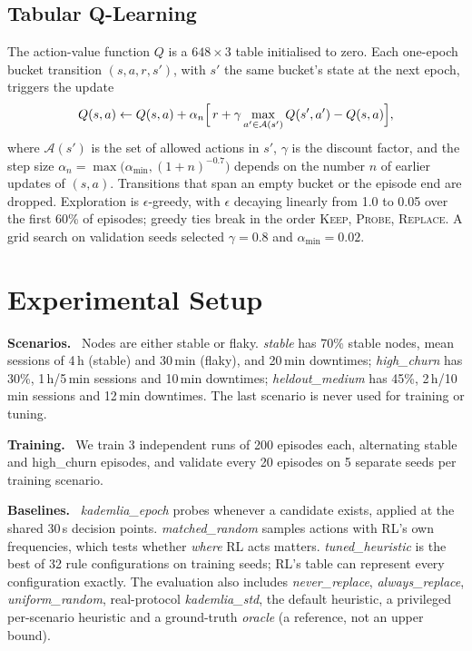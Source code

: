 \documentclass[9pt,twocolumn]{extarticle}
\newcommand{\inl}[1]{\mbox{\textbf{#1.}}\ }
\newcommand{\act}[1]{\textsc{#1}}
\newcommand{\pol}[1]{\textit{#1}}
\begin{document}
\subsection{Tabular Q-Learning}
The action-value function $Q$ is a $648\times3$ table initialised to zero. Each one-epoch bucket transition $(s,a,r,s')$, with $s'$ the same bucket's state at the next epoch, triggers the update
\begin{equation}
Q(s,a) \leftarrow Q(s,a) + \alpha_n \Bigl[\, r + \gamma \max_{a'\in\mathcal{A}(s')} Q(s',a') - Q(s,a) \Bigr],
\label{eq:qupdate}
\end{equation}
where $\mathcal{A}(s')$ is the set of allowed actions in $s'$, $\gamma$ is the discount factor, and the step size $\alpha_n=\max\bigl(\alpha_{\min},(1+n)^{-0.7}\bigr)$ depends on the number $n$ of earlier updates of $(s,a)$. Transitions that span an empty bucket or the episode end are dropped. Exploration is $\epsilon$-greedy, with $\epsilon$ decaying linearly from 1.0 to 0.05 over the first 60\% of episodes; greedy ties break in the order \act{Keep}, \act{Probe}, \act{Replace}. A grid search on validation seeds selected $\gamma=0.8$ and $\alpha_{\min}=0.02$.

\section{Experimental Setup}
\inl{Scenarios} Nodes are either stable or flaky. \pol{stable} has 70\% stable nodes, mean sessions of 4\,h (stable) and 30\,min (flaky), and 20\,min downtimes; \pol{high\_churn} has 30\%, 1\,h/5\,min sessions and 10\,min downtimes; \pol{heldout\_medium} has 45\%, 2\,h/10\,min sessions and 12\,min downtimes. The last scenario is never used for training or tuning.

\inl{Training} We train 3 independent runs of 200 episodes each, alternating stable and high\_churn episodes, and validate every 20 episodes on 5 separate seeds per training scenario.

\inl{Baselines} \pol{kademlia\_epoch} probes whenever a candidate exists, applied at the shared 30\,s decision points. \pol{matched\_random} samples actions with RL's own frequencies, which tests whether \emph{where} RL acts matters. \pol{tuned\_heuristic} is the best of 32 rule configurations on training seeds; RL's table can represent every configuration exactly. The evaluation also includes \pol{never\_replace}, \pol{always\_replace}, \pol{uniform\_random}, real-protocol \pol{kademlia\_std}, the default heuristic, a privileged per-scenario heuristic and a ground-truth \pol{oracle} (a reference, not an upper bound).
\end{document}
